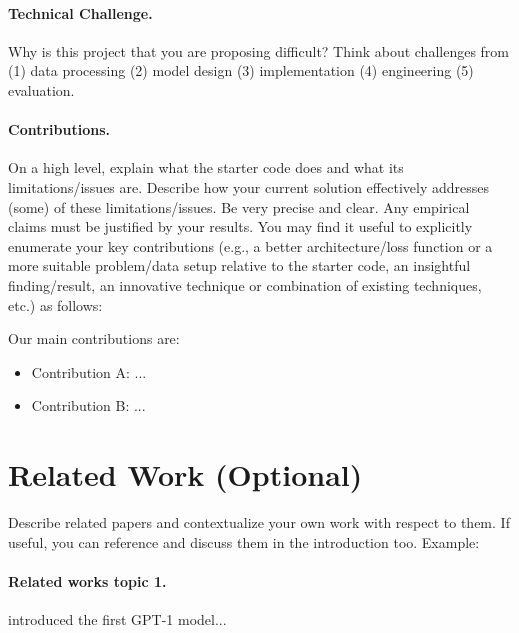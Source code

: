 \documentclass{article}
\begin{document}
\paragraph{Technical Challenge.}
Why is this project that you are proposing difficult? Think about challenges from (1) data processing (2) model design (3) implementation (4) engineering (5) evaluation. 


\paragraph{Contributions.}
 On a high level, explain what the starter code does and what its limitations/issues are. Describe how your current solution effectively addresses (some) of these limitations/issues. Be very precise and clear. Any empirical claims must be justified by your results. You may find it useful to explicitly enumerate your key contributions (e.g., a better architecture/loss function or a more suitable problem/data setup relative to the starter code, an insightful finding/result, an innovative technique or combination of existing techniques, etc.) as follows:



Our main contributions are:
\begin{itemize}
  \item Contribution A: ...
  \item Contribution B: ...  
\end{itemize}

\section{Related Work (Optional)}
\label{sec:relatedwork}
Describe related papers and contextualize your own work with respect to them. If useful, you can reference and discuss them in the introduction too. Example:
\paragraph{Related works topic 1.} \citet{radford2018improving} introduced the first GPT-1 model...  %
\end{document}
